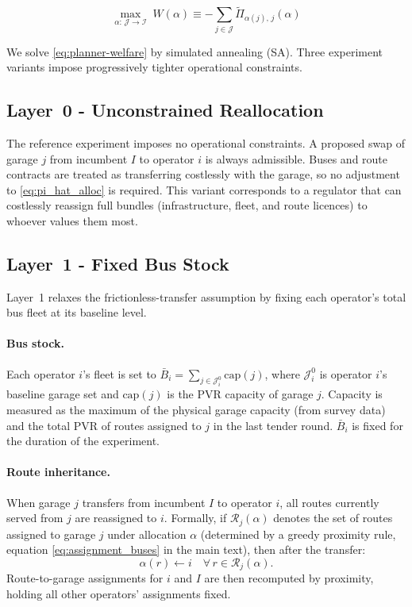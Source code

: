 \documentclass[12pt]{article}
\begin{document}
\begin{equation}
    \max_{\alpha:\,\mathcal{J}\to\mathcal{I}} \; W(\alpha) \equiv -\sum_{j \in \mathcal{J}} \tilde{\Pi}_{\alpha(j),\,j}(\alpha)\label{eq:planner-welfare}
\end{equation}

%
We solve \eqref{eq:planner-welfare} by simulated annealing (SA).  Three
experiment variants impose progressively tighter operational constraints.

\subsection{Layer~0 - Unconstrained Reallocation}

The reference experiment imposes no operational constraints.  A proposed
swap of garage $j$ from incumbent $I$ to operator $i$ is always
admissible.  Buses and route contracts are treated as transferring
costlessly with the garage, so no adjustment to \eqref{eq:pi_hat_alloc}
is required.  This variant corresponds to a regulator that can costlessly
reassign full bundles (infrastructure, fleet, and route licences) to
whoever values them most.

\subsection{Layer~1 - Fixed Bus Stock}

Layer~1 relaxes the frictionless-transfer assumption by fixing each
operator's total bus fleet at its baseline level.

\paragraph{Bus stock.}
Each operator $i$'s fleet is set to
$\bar{B}_i = \sum_{j \in \mathcal{J}^0_i} \text{cap}(j)$,
where $\mathcal{J}^0_i$ is operator $i$'s baseline garage set and
$\text{cap}(j)$ is the PVR capacity of garage $j$.  Capacity is measured
as the maximum of the physical garage capacity (from survey data) and the
total PVR of routes assigned to $j$ in the last tender round.
$\bar{B}_i$ is fixed for the duration of the experiment.

\paragraph{Route inheritance.}
When garage $j$ transfers from incumbent $I$ to operator $i$, all routes
currently served from $j$ are reassigned to $i$.  Formally, if
$\mathcal{R}_j(\alpha)$ denotes the set of routes assigned to garage $j$
under allocation $\alpha$ (determined by a greedy proximity rule,
equation \eqref{eq:assignment_buses} in the main text), then after the
transfer:
\[
  \alpha(r) \leftarrow i \quad \forall\, r \in \mathcal{R}_j(\alpha).
\]
Route-to-garage assignments for $i$ and $I$ are then recomputed by
proximity, holding all other operators' assignments fixed.
\end{document}
